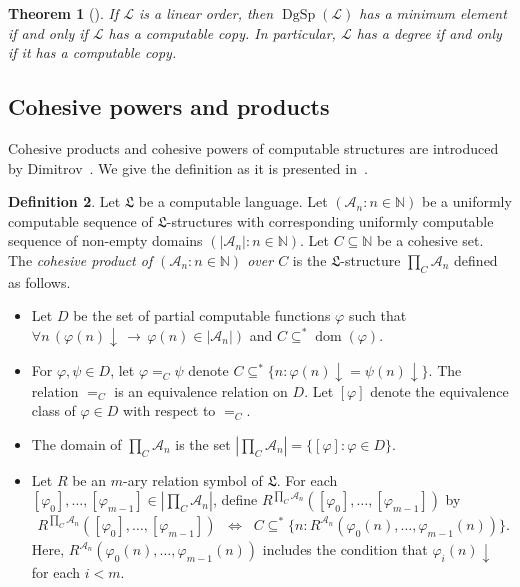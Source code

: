 \documentclass[11pt,a4paper,reqno]{amsart}
\newtheorem{Theorem}{Theorem}[section]
\theoremstyle{definition}
\newtheorem{Definition}[Theorem]{Definition}
\DeclareMathOperator{\dom}{\mathrm{dom}}
\DeclareMathOperator{\dgsp}{\mathrm{DgSp}}
\newcommand{\da}{{\downarrow}}
\newcommand{\imp}{\rightarrow}
\newcommand{\Biimp}{\Leftrightarrow}
\newcommand{\Nb}{\mathbb{N}}
\newcommand{\mc}[1]{\mathcal{#1}}
\newcommand{\mf}[1]{\mathfrak{#1}}
\begin{document}
\begin{Theorem}[\cite{Ric81}]\label{richter}
If $\mc{L}$ is a linear order, then $\dgsp(\mc{L})$ has a minimum element if and only if $\mc{L}$ has a computable copy.
In particular, $\mc{L}$ has a degree if and only if it has a computable copy.
\end{Theorem}

\subsection*{Cohesive powers and products}

Cohesive products and cohesive powers of computable structures are introduced by Dimitrov~\cite{DimitrovCohPow}.  We give the definition as it is presented in~\cite{CohPowJournal}.

\begin{Definition}\label{def-CohProd}
Let $\mf{L}$ be a computable language.  Let $(\mc{A}_n : n \in \Nb)$ be a uniformly computable sequence of $\mf{L}$-structures with corresponding uniformly computable sequence of non-empty domains $(|\mc{A}_n| : n \in \Nb)$.  Let $C \subseteq \Nb$ be a cohesive set.  The \emph{cohesive product of $(\mc{A}_n : n \in \Nb)$ over $C$} is the $\mf{L}$-structure $\prod_C \mc{A}_n$ defined as follows.

\begin{itemize}
\item Let $D$ be the set of partial computable functions $\varphi$ such that $\forall n \, (\varphi(n)\da \,\imp\, \varphi(n) \in |\mc{A}_n|)$ and $C \subseteq^* \dom(\varphi)$.

\medskip

\item For $\varphi, \psi \in D$, let $\varphi =_C \psi$ denote $C \subseteq^* \{n : \varphi(n)\da = \psi(n)\da\}$.  The relation $=_C$ is an equivalence relation on $D$.  Let $[\varphi]$ denote the equivalence class of $\varphi \in D$ with respect to $=_C$.

\medskip

\item The domain of $\prod_C \mc{A}_n$ is the set $|\prod_C \mc{A}_n| = \{[\varphi] : \varphi \in D\}$.

\medskip

\item 
Let $R$ be an $m$-ary relation symbol of $\mf{L}$.  For each $[\varphi_0], \dots, [\varphi_{m-1}] \in |\prod_C \mc{A}_n|$, define $R^{\prod_C \mc{A}_n}([\varphi_0], \dots, [\varphi_{m-1}])$ by
\begin{align*}
R^{\prod_C \mc{A}_n}([\varphi_0], \dots, [\varphi_{m-1}]) \;\;\Biimp\;\; C \subseteq^* \bigl\{n : R^{\mc{A}_n}(\varphi_0(n), \dots, \varphi_{m-1}(n))\bigr\}.
\end{align*}
Here, $R^{\mc{A}_n}(\varphi_0(n), \dots, \varphi_{m-1}(n))$ includes the condition that $\varphi_i(n)\da$ for each $i < m$.


\end{itemize}
\end{Definition}
\end{document}
